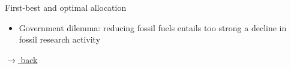 \documentclass[11pt,aspectratio=169]{beamer}
\begin{document}
\begin{frame}{First-best and optimal allocation}
\begin{figure}[h!!]
\begin{subfigure}{0.45\textwidth}
		\end{subfigure}
	\end{figure}
	\vspace{1mm}
	\begin{block}{}
		\begin{itemize}
			\item {Government dilemma: reducing fossil fuels entails too strong a decline in fossil research activity}
		\end{itemize}
	\end{block}	
	\vspace{-5.7mm}
	\hfill
	\hyperlink{backOPT}{\tiny{$\rightarrow$ back}}
\end{frame}	
	
\end{document}

